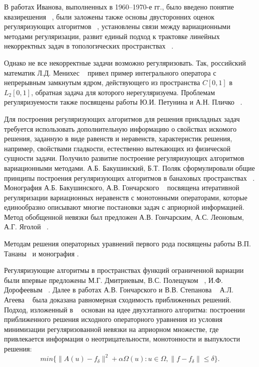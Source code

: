 {В работах Иванова, выполненных в 1960--1970-е гг., было введено понятие квазирешения ~\cite{Iv1962_2, Iv1963}, были заложены также основы двусторонних оценок регуляризующих алгоритмов ~\cite{Iv1966}, установлены связи между вариационными методами регуляризации, развит единый подход к трактовке линейных некорректных задач в топологических пространствах ~\cite{Iv1967}. 

Однако не все некорректные задачи возможно регуляризовать. Так, российский математик Л.Д. Менихес ~\cite{Menih1978} привел пример интегрального оператора с непрерывным замкнутым ядром, действующего из пространства \( C[0,1] \) в \( L_2[0,1] \), обратная задача для которого нерегуляризуема. Проблемам регуляризуемости также посвящены работы Ю.И. Петунина и А.Н. Пличко ~\cite{PetPlich1980}.

Для построения регуляризующих алгоритмов для решения прикладных задач требуется использовать дополнительную информацию о свойствах искомого решения, заданную в виде равенств и неравенств, характеристик решения, например, свойствами гладкости, естественно вытекающих из физической сущности задачи. Получило развитие построение регуляризующих алгоритмов вариационными методами. А.Б. Бакушинский, Б.Т. Поляк сформулировали общие принципы построения регуляризующих алгоритмов в банаховых пространствах ~\cite{BakPol1974}. Монография А.Б. Бакушинского, А.В. Гончарского ~\cite{BakGon1989} посвящена итеративной регуляризации вариационных неравенств с монотонными операторами, которые единообразно описывают многие постановки задач с априорной информацией. Метод обобщенной невязки был предложен А.В. Гончарским, А.С. Леоновым, А.Г. Яголой ~\cite{GonLeoYag1973}.

Методам решения операторных уравнений первого рода посвящены работы В.П. Тананы~\cite{Tan1977, Tan1997, Tan2003} и монография \cite{Tan1981}.

Регуляризующие алгоритмы в пространствах функций ограниченной вариации были впервые предложены М.Г. Дмитриевым, В.С. Полещуком ~\cite{DmiPol1972}, И.Ф. Дорофеевым ~\cite{Dor1979}. Далее в работах А.В. Гончарского и В.В. Степанова ~\cite{GonSte1979} А.Л. Агеева ~\cite{Ag1980} была доказана равномерная сходимость приближенных решений. Подход, изложенный в ~\cite{TikhGonSteYag1990} основан на идее двухэтапного алгоритма: построении приближенного решения  исходного операторного уравнения из условия минимизации регуляризованной невязки на априорном множестве, где привлекается информация о неотрицательности, монотонности и выпуклости решения: $$min\{\| A(u)-f_\delta\| ^2 + \alpha \Omega(u): u\in\Omega, \|f-f_\delta\|\le\delta \}.$$ 

}
